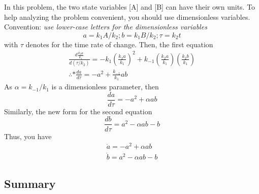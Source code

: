 In this problem, the two state variables [A] and [B] can have their
own units. To help analyzing the problem convenient, you should use
dimensionless variables. Convention:
{\it use lower-case letters for the dimensionless variables}
\begin{equation}
  \label{eq:117}
  a = k_1A/k_2; b = k_1B/k_2; \tau = k_2t
\end{equation}
with $\tau$ denotes for the time rate of change.  Then, the first
equation
\begin{equation}
  \label{eq:116}
  \begin{split}
    \frac{d\frac{k_2a}{k_1}}{d(\tau/k_2)} = -k_1 (\frac{k_2a}{k_1})^2
    + k_{-1} (\frac{k_2a}{k_1}) (\frac{k_2b}{k_1}) \\
\therefore* \frac{da}{d\tau} = -a^2 + \frac{k_{-1}}{k_1}ab
  \end{split}
\end{equation}
As $\alpha = k_{-1}/k_1$ is a dimensionless parameter, then
\begin{equation}
  \label{eq:118}
  \frac{da}{d\tau} = -a^2 + \alpha ab
\end{equation}
Similarly, the new form for the second equation
\begin{equation}
  \label{eq:119}
  \frac{db}{d\tau} = a^2 - \alpha ab - b
\end{equation}
Thus, you have
\begin{equation}
  \label{eq:120}
  \begin{split}
      \dot{a} = -a^2 + \alpha ab  \\
      \dot{b} = a^2 - \alpha ab - b
  \end{split}
\end{equation}



\subsection{Summary}
\label{sec:summary-5}

